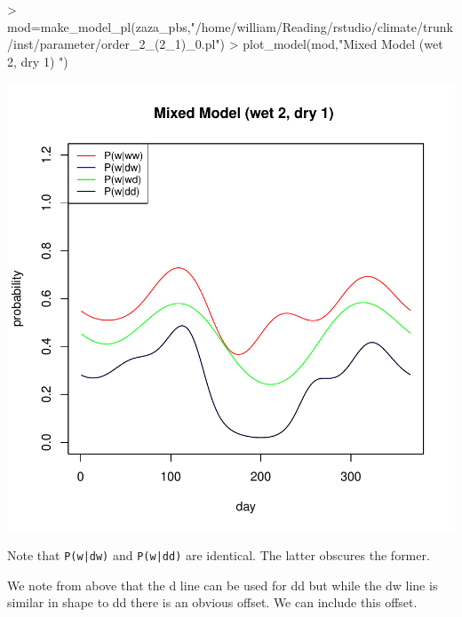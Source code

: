 \documentclass{article}
\begin{document}
\begin{Schunk}
\begin{Sinput}
> mod=make_model_pl(zaza_pbs,"/home/william/Reading/rstudio/climate/trunk/inst/parameter/order_2_(2_1)_0.pl")
> plot_model(mod,"Mixed Model (wet 2, dry 1) ")
\end{Sinput}
\end{Schunk}
\includegraphics{climate_vignette-012}

Note that {\tt P(w|dw)} and {\tt P(w|dd)} are identical.  The latter
obscures the former.

We note from above that the d line can be used for dd
but while the dw line is similar in shape to dd there is an
obvious offset.   We can include this offset.
\end{document}
